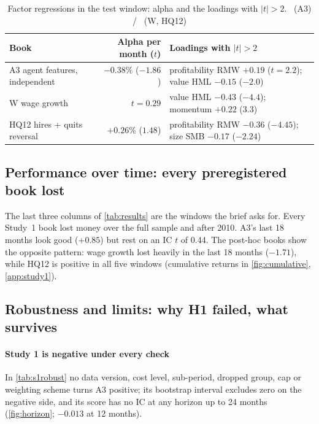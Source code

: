 \begin{table}[!htbp]
\centering\footnotesize
\caption{Factor regressions in the test window: alpha and the loadings with $|t|>2$. \hfill\tagc\ (A3) / \tagp\ (W, HQ12)}
\label{tab:loadings}
\begin{tabular}{@{}l r l@{}}
\toprule
Book & Alpha per month ($t$) & Loadings with $|t|>2$ \\
\midrule
A3 agent features, independent & $-0.38\%$ ($-1.86$) & profitability RMW $+0.19$ ($t=2.2$); value HML $-0.15$ ($-2.0$) \\ %
W wage growth & $t=0.29$ & value HML $-0.43$ ($-4.4$); momentum $+0.22$ ($3.3$) \\ %
HQ12 hires + quits reversal & $+0.26\%$ ($1.48$) & profitability RMW $-0.36$ ($-4.45$); size SMB $-0.17$ ($-2.24$) \\ %
\bottomrule
\end{tabular}
\end{table}

\subsection{Performance over time: every preregistered book lost}\label{sec:time}
The last three columns of \cref{tab:results} are the windows the brief asks for. Every Study~1 book lost money over the full sample and after 2010. A3's last 18 months look good ($+0.85$) but rest on an IC $t$ of 0.44. %
The post-hoc books show the opposite pattern: wage growth lost heavily in the last 18 months ($-1.71$), while HQ12 is positive in all five windows (cumulative returns in \cref{fig:cumulative}, \cref{app:study1}). %

\subsection{Robustness and limits: why H1 failed, what survives}\label{sec:robust}

\paragraph{Study 1 is negative under every check} In \cref{tab:s1robust} no data version, cost level, sub-period, dropped group, cap or weighting scheme turns A3 positive; its bootstrap interval excludes zero on the negative side, and its score has no IC at any horizon up to 24 months (\cref{fig:horizon}; $-0.013$ at 12 months). %


